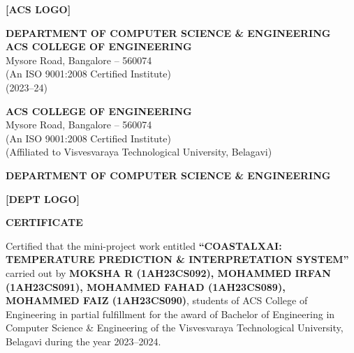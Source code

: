 \documentclass[12pt, a4paper]{article}
\begin{document}
\begin{titlepage}
\begin{center}
    \vspace{1.5cm}
    \begin{tcolorbox}[colback=white, colframe=black, width=4cm, height=4cm,
                      halign=center, valign=center]
      \textbf{[ACS LOGO]}
    \end{tcolorbox}

    \vspace{0.5cm}
    {\large \textbf{DEPARTMENT OF COMPUTER SCIENCE \& ENGINEERING}}\\
    {\Large \textbf{ACS COLLEGE OF ENGINEERING}}\\
    \normalsize Mysore Road, Bangalore -- 560074\\
    (An ISO 9001:2008 Certified Institute)\\
    (2023--24)

  \end{center}
\end{titlepage}

\newpage
\thispagestyle{empty}
\begin{center}
  {\large \textbf{ACS COLLEGE OF ENGINEERING}}\\
  Mysore Road, Bangalore -- 560074\\
  (An ISO 9001:2008 Certified Institute)\\
  (Affiliated to Visvesvaraya Technological University, Belagavi)

  \vspace{0.8cm}
  {\large \textbf{DEPARTMENT OF COMPUTER SCIENCE \& ENGINEERING}}

  \vspace{0.6cm}
  \begin{tcolorbox}[colback=white, colframe=black, width=3cm, height=3cm,
                    halign=center, valign=center]
    \textbf{[DEPT LOGO]}
  \end{tcolorbox}

  \vspace{0.6cm}
  {\Large \textbf{CERTIFICATE}}
\end{center}

\vspace{0.8cm}
\noindent
Certified that the mini-project work entitled \textbf{``COASTALXAI: TEMPERATURE
PREDICTION \& INTERPRETATION SYSTEM''} carried out by
\textbf{MOKSHA R (1AH23CS092), MOHAMMED IRFAN (1AH23CS091),
MOHAMMED FAHAD (1AH23CS089), MOHAMMED FAIZ (1AH23CS090)},
students of ACS College of Engineering in partial fulfillment for the award of Bachelor
of Engineering in Computer Science \& Engineering of the Visvesvaraya Technological
University, Belagavi during the year 2023--2024.
\end{document}
